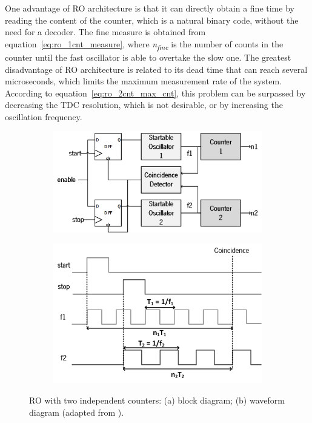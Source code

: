 One advantage of \gls{RO} architecture is that it can directly obtain a fine time by reading the content of the counter, which is a natural binary code, without the need for a decoder. The fine measure is obtained from equation~\ref{eq:ro_1cnt_measure}, where \textit{n\textsubscript{fine}} is the number of counts in the counter until the fast oscillator is able to overtake the slow one. The greatest disadvantage of \gls{RO} architecture is related to its dead time that can reach several microseconds, which limits the maximum measurement rate of the system. According to equation~\ref{eq:ro_2cnt_max_cnt}, this problem can be surpassed by decreasing the \gls{TDC} resolution, which is not desirable, or by increasing the oscillation frequency.

\begin{figure}[ht!]
	\centering
	\begin{subfigure}{.49\textwidth}
		\centering
		\includegraphics[width=\linewidth]{img/02_StateofArt/RO_2cnt_bd.png}
		\caption{}
		\label{fig:ro_2_cnt_bd}
	\end{subfigure}
	\hfill
	\begin{subfigure}{.49\textwidth}
		\centering
		\includegraphics[width=\linewidth]{img/02_StateofArt/ro_2cnt_wf.png}
		\caption{}
		\label{fig:ro_2_cnt_wf}
	\end{subfigure}
	\caption{RO with two independent counters: (a) block diagram; (b) waveform diagram (adapted from \citep{ro_2_counter}).}
	\label{fig:ro_2_cnt}
\end{figure}

